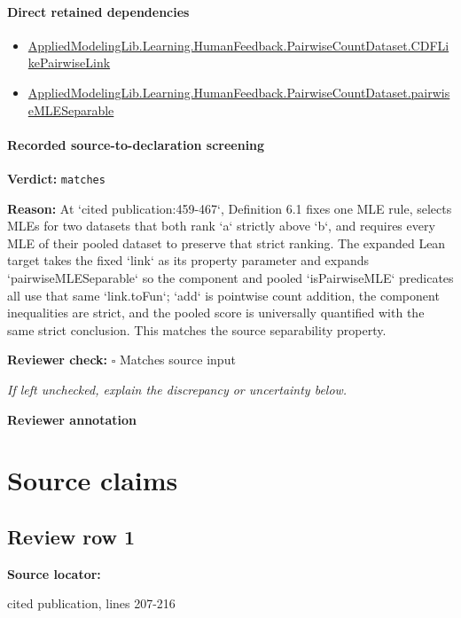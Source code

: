 \documentclass[10pt]{article}
\newcommand{\reviewerbox}{%
  \par\noindent\fbox{\parbox{0.96\linewidth}{\rule{0pt}{0.38in}}}\par
}
\newcommand{\reviewmatch}[1]{%
  \par\noindent\textbf{Reviewer check:} $\square$\; #1\par
  \noindent\emph{If left unchecked, explain the discrepancy or uncertainty below.}\par
}
\begin{document}
\paragraph{Direct retained dependencies}
\begin{itemize}\raggedright
\item \hyperlink{governing-declaration-3449f3559185d0fd}{Applied\allowbreak{}Modeling\allowbreak{}Lib.\allowbreak{}Learning.\allowbreak{}Human\allowbreak{}Feedback.\allowbreak{}Pairwise\allowbreak{}Count\allowbreak{}Dataset.\allowbreak{}CDF\allowbreak{}Like\allowbreak{}Pairwise\allowbreak{}Link}
\item \hyperlink{governing-declaration-96ca4c86e46da1ec}{Applied\allowbreak{}Modeling\allowbreak{}Lib.\allowbreak{}Learning.\allowbreak{}Human\allowbreak{}Feedback.\allowbreak{}Pairwise\allowbreak{}Count\allowbreak{}Dataset.\allowbreak{}pairwise\allowbreak{}MLE\allowbreak{}Separable}
\end{itemize}
\paragraph{Recorded source-to-declaration screening}
\textbf{Verdict:} \texttt{matches}
\\
{\raggedright
\textbf{Reason:} At `cited publication:\allowbreak{}459-\allowbreak{}467`, Definition 6.\allowbreak{}1 fixes one MLE rule, selects MLEs for two datasets that both rank `a` strictly above `b`, and requires every MLE of their pooled dataset to preserve that strict ranking.\allowbreak{} The expanded Lean target takes the fixed `link` as its property parameter and expands `pairwiseMLESeparable` so the component and pooled `isPairwiseMLE` predicates all use that same `link.\allowbreak{}toFun`;\allowbreak{} `add` is pointwise count addition, the component inequalities are strict, and the pooled score is universally quantified with the same strict conclusion.\allowbreak{} This matches the source separability property.\allowbreak{}
\par}
\reviewmatch{Matches source input}
\noindent\textbf{Reviewer annotation}\par
\reviewerbox

\clearpage
\hypertarget{source-claim-a399fdd5be732a4d}{}
\hypertarget{source-section-f10b5f68e4acf3dc}{}
\section*{Source claims}
\subsection*{Review row 1}
\textbf{Source locator:} {\footnotesize\raggedright cited publication, lines 207-\allowbreak{}216\par}
\end{document}
